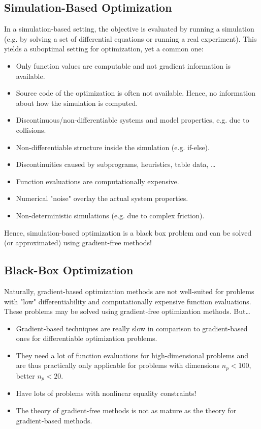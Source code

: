 		\subsection{Simulation-Based Optimization}
			In a simulation-based setting, the objective is evaluated by running a simulation (e.g. by solving a set of differential equations or running a real experiment). This yields a suboptimal setting for optimization, yet a common one:
			\begin{itemize}
				\item Only function values are computable and not gradient information is available.
				\item Source code of the optimization is often not available. Hence, no information about how the simulation is computed.
				\item Discontinuous/non-differentiable systems and model properties, e.g. due to collisions.
				\item Non-differentiable structure inside the simulation (e.g. if-else).
				\item Discontinuities caused by subprograms, heuristics, table data, \dots
				\item Function evaluations are computationally expensive.
				\item Numerical "noise" overlay the actual system properties.
				\item Non-deterministic simulations (e.g. due to complex friction).
			\end{itemize}
			Hence, simulation-based optimization is a black box problem and can be solved (or approximated) using gradient-free methods!

		\subsection{Black-Box Optimization}
			Naturally, gradient-based optimization methods are not well-suited for problems with "low" differentiability and computationally expensive function evaluations. These problems may be solved using gradient-free optimization methods. But\dots
			\begin{itemize}
				\item Gradient-based techniques are really slow in comparison to gradient-based ones for differentiable optimization problems.
				\item They need a lot of function evaluations for high-dimensional problems and are thus practically only applicable for problems with dimensions \( n_p < 100 \), better \( n_p < 20 \).
				\item Have lots of problems with nonlinear equality constraints!
				\item The theory of gradient-free methods is not as mature as the theory for gradient-based methods.
			\end{itemize}

